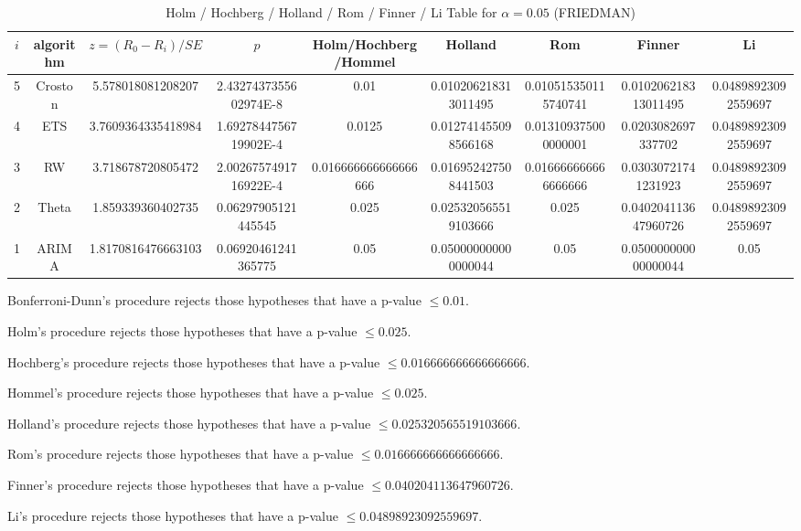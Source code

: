 \documentclass[a4paper,10pt]{article}
\begin{document}
\begin{landscape}
\begin{table}[!htp]
\centering\scriptsize
\caption{Holm / Hochberg / Holland / Rom / Finner / Li Table for $\alpha=0.05$ (FRIEDMAN)}
\begin{tabular}{ccccccccc}
$i$&algorithm&$z=(R_0 - R_i)/SE$&$p$&Holm/Hochberg/Hommel&Holland&Rom&Finner&Li\\
\hline
5&Croston&5.578018081208207&2.4327437355602974E-8&0.01&0.010206218313011495&0.010515350115740741&0.010206218313011495&0.04898923092559697\\
4&ETS&3.7609364335418984&1.6927844756719902E-4&0.0125&0.012741455098566168&0.013109375000000001&0.0203082697337702&0.04898923092559697\\
3&RW&3.718678720805472&2.0026757491716922E-4&0.016666666666666666&0.016952427508441503&0.016666666666666666&0.03030721741231923&0.04898923092559697\\
2&Theta&1.859339360402735&0.06297905121445545&0.025&0.025320565519103666&0.025&0.040204113647960726&0.04898923092559697\\
1&ARIMA&1.8170816476663103&0.06920461241365775&0.05&0.050000000000000044&0.05&0.050000000000000044&0.05\\
\hline
\end{tabular}
\end{table}
Bonferroni-Dunn's procedure rejects those hypotheses that have a p-value $\le0.01$.


Holm's procedure rejects those hypotheses that have a p-value $\le0.025$.


Hochberg's procedure rejects those hypotheses that have a p-value $\le0.016666666666666666$.


Hommel's procedure rejects those hypotheses that have a p-value $\le0.025$.


Holland's procedure rejects those hypotheses that have a p-value $\le0.025320565519103666$.


Rom's procedure rejects those hypotheses that have a p-value $\le0.016666666666666666$.


Finner's procedure rejects those hypotheses that have a p-value $\le0.040204113647960726$.


Li's procedure rejects those hypotheses that have a p-value $\le0.04898923092559697$.



\newpage


\end{landscape}
\end{document}
